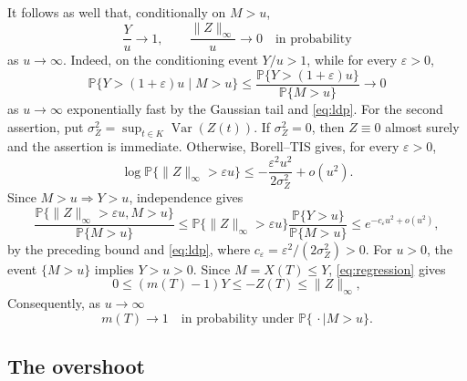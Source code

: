 \documentclass[11pt]{amsart}
\theoremstyle{definition}
\theoremstyle{remark}
\DeclareMathOperator*{\Var}{Var}
\newcommand{\Pp}{\mathbb P}
\begin{document}
It follows as well that, conditionally on $M>u$,
\begin{equation}
 \frac Yu\longrightarrow1,
 \qquad
 \frac{\|Z\|_\infty}{u}\longrightarrow0
 \quad\text{in probability}
 \label{eq:concentration}
\end{equation}
as $u\to\infty$. 
Indeed, on the conditioning event $Y/u>1$, while for every
$\varepsilon>0$,
\[
 \Pp\{Y>(1+\varepsilon)u\mid M>u\}
 \leq \frac{\Pp\{Y>(1+\varepsilon)u\}}{\Pp\{M>u\}}
 \longrightarrow0
\]
as $u\to\infty$ exponentially fast by the Gaussian tail and \eqref{eq:ldp}.
For the second assertion, put
$\sigma_Z^2=\sup_{t\in K}\Var(Z(t))$.  If $\sigma_Z^2=0$, then
$Z\equiv0$ almost surely and the assertion is immediate.  Otherwise,
Borell--TIS gives, for every $\varepsilon>0$,
\[
 \log\Pp\{\|Z\|_\infty>\varepsilon u\}
 \leq-\frac{\varepsilon^2u^2}{2\sigma_Z^2}+o(u^2).
\]
Since $M>u\Rightarrow Y>u$, independence gives
\[
 \frac{\Pp\{\|Z\|_\infty>\varepsilon u,M>u\}}{\Pp\{M>u\}}
 \leq
 \Pp\{\|Z\|_\infty>\varepsilon u\}
 \frac{\Pp\{Y>u\}}{\Pp\{M>u\}}
 \leq e^{-c_\varepsilon u^2+o(u^2)},
\]
by the preceding bound and \eqref{eq:ldp}, where
$c_\varepsilon=\varepsilon^2/(2\sigma_Z^2)>0$.  For $u>0$, the event
$\{M>u\}$ implies $Y>u>0$.
Since $M=X(T)\leq Y$, \eqref{eq:regression} gives
\[
 0\leq (m(T)-1)Y
 \leq -Z(T)
 \leq \|Z\|_\infty,
\]
Consequently, as $u\to\infty$
\begin{equation}
 m(T)\longrightarrow1
 \quad\text{in probability under }\Pp\{\,\cdot\mid M>u\}.
 \label{eq:contact}
\end{equation}

\subsection{The overshoot}
\end{document}
